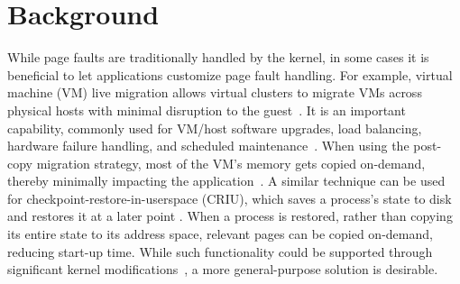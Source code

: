 \section{Background}
\label{sec:background}



While page faults are traditionally handled by the kernel, in some cases it is beneficial to let applications customize page fault handling. For example, virtual machine (VM) live migration allows virtual clusters to migrate VMs across physical hosts with minimal disruption to the guest~\cite{vm-migration}. It is an important capability, commonly used for VM/host software upgrades, load balancing, hardware failure handling, and scheduled maintenance~\cite{google-live-migration-at-scale}.
When using the post-copy migration strategy, most of the VM's memory gets copied on-demand, thereby minimally impacting the application~\cite{post-copy, bare-metal-post-copy}. A similar technique can be used for checkpoint-restore-in-userspace (CRIU), which saves a process's state to disk and restores it at a later point \cite{CRIU_Userfaultfd}. When a process is restored, rather than copying its entire state to its address space, relevant pages can be copied on-demand, reducing start-up time. While such functionality could be supported through significant kernel modifications~\cite{post-copy}, a more general-purpose solution is desirable.



